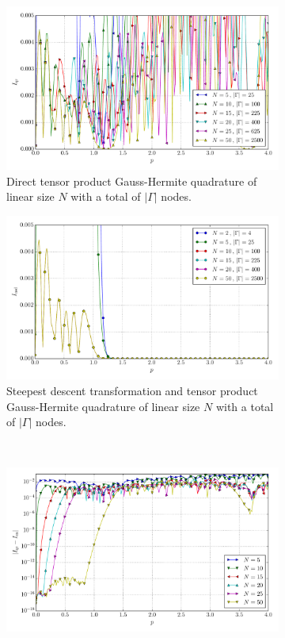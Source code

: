 \documentclass[a4paper,10pt]{article}
\begin{document}
\begin{figure}[ht!]
  \begin{subfigure}[t]{0.5\linewidth}
    \includegraphics[width=\linewidth]{./plots/tp_2d_conv_p_(8,8)_(8,8)_val_qr.pdf}
    \caption{Direct tensor product Gauss-Hermite quadrature of linear size $N$ with a total of $|\Gamma|$ nodes.}
    \label{fig:tp_2d_conv_p_88_88_val_qr}
  \end{subfigure}
  \begin{subfigure}[t]{0.5\linewidth}
    \includegraphics[width=\linewidth]{./plots/tp_2d_conv_p_(8,8)_(8,8)_val_nsd.pdf}
    \caption{Steepest descent transformation and tensor product Gauss-Hermite quadrature of linear size $N$ with a total of $|\Gamma|$ nodes.}
    \label{fig:tp_2d_conv_p_88_88_val_nsd}
  \end{subfigure} \\
  \begin{subfigure}[t]{0.5\linewidth}
    \includegraphics[width=\linewidth]{./plots/tp_2d_conv_p_(8,8)_(8,8)_err_qr.pdf}

\end{subfigure}
\end{figure}
\end{document}

